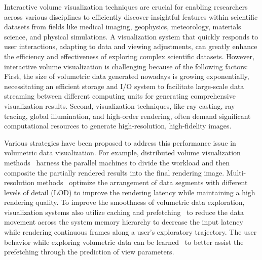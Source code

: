 \maketitle
Interactive volume visualization techniques are crucial for enabling researchers across various disciplines to efficiently discover insightful features within scientific datasets from fields like medical imaging, geophysics, meteorology, materials science, and physical simulations. A visualization system that quickly responds to user interactions, adapting to data and viewing adjustments, can greatly enhance the efficiency and effectiveness of exploring complex scientific datasets. However, interactive volume visualization is challenging because of the following factors: First, the size of volumetric data generated nowadays is growing exponentially, necessitating an efficient storage and I/O system to facilitate large-scale data streaming between different computing units for generating comprehensive visualization results. Second, visualization techniques, like ray casting, ray tracing, global illumination, and high-order rendering, often demand significant computational resources to generate high-resolution, high-fidelity images.

Various strategies have been proposed to address this performance issue in volumetric data visualization. For example, distributed volume visualization methods~\cite{10386434, 5219060} harness the parallel machines to divide the workload and then composite the partially rendered results into the final rendering image. Multi-resolution methods~\cite{Heckbert1999MultiresolutionMF, 10.1145/1186822.1073277, GUTHE200451, 1234567} optimize the arrangement of data segments with different levels of detail (LOD) to improve the rendering latency while maintaining a high rendering quality. To improve the smoothness of volumetric data exploration, visualization systems also utilize caching and prefetching~\cite{10.1145/279361.279372, 10.1145/2907071} to reduce the data movement across the system memory hierarchy to decrease the input latency while rendering continuous frames along a user's exploratory trajectory. The user behavior while exploring volumetric data can be learned~\cite{10549835, 8365978} to better assist the prefetching through the prediction of view parameters.

